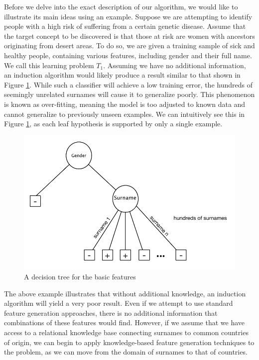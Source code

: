 \documentclass{article}
\theoremstyle{definition}
\begin{document}
Before we delve into the exact description of our algorithm, we would like to illustrate its main ideas using an example.
Suppose we are attempting to identify people with a high risk of suffering from a certain genetic disease. Assume that the target concept to be discovered is that those at risk are women with ancestors originating from desert areas. To do so, we are given a training sample of sick and healthy people, containing various features, including gender and their full name. We call this learning problem $T_1$.
Assuming we have no additional information, an induction algorithm would likely produce a result similar to that shown in Figure \ref{fig:tree_base}. While such a classifier will achieve a low training error, the hundreds of seemingly unrelated surnames will cause it to generalize poorly. This phenomenon is known as over-fitting, meaning the model is too adjusted to known data and cannot generalize to previously unseen examples. We can intuitively see this in Figure \ref{fig:tree_base}, as each leaf hypothesis is supported by only a single example.

\begin{figure}[h]
	\centering
	\includegraphics[width=\linewidth]{fig1.pdf}
	\caption{A decision tree for the basic features}
	\label{fig:tree_base}
\end{figure}

The above example illustrates that without additional knowledge, an induction algorithm will yield a very poor result. Even if we attempt to use standard feature generation approaches, there is no additional information that combinations of these features would find.
However, if we assume that we have access to a relational knowledge base connecting surnames to common countries of origin, we can begin to apply knowledge-based feature generation techniques to the problem, as we can move from the domain of surnames to that of countries. 
\end{document}
